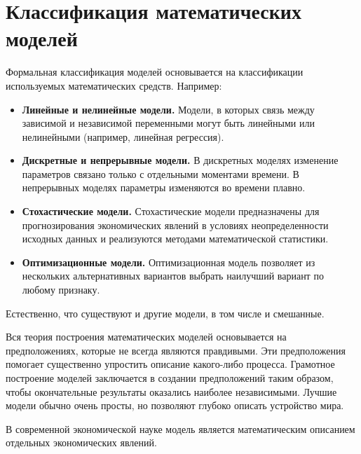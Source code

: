 \section{Классификация математических моделей}

Формальная классификация моделей основывается на классификации используемых математических средств.
Например:
\begin{itemize}
	\item \textbf{Линейные и нелинейные модели.}
	Модели, в которых связь между зависимой и независимой переменными могут быть линейными или нелинейными (например, линейная регрессия).
	\item \textbf{Дискретные и непрерывные модели.}
	В дискретных моделях изменение параметров связано только с отдельными моментами времени.
	В непрерывных моделях параметры изменяются во времени плавно.
	\item \textbf{Стохастические модели.}
	Стохастические модели предназначены для прогнозирования экономических явлений в условиях неопределенности исходных данных и реализуются методами математической статистики.
	\item \textbf{Оптимизационные модели.}
	Оптимизационная модель позволяет из нескольких альтернативных вариантов выбрать наилучший вариант по любому признаку.
\end{itemize}
Естественно, что существуют и другие модели, в том числе и смешанные.

Вся теория построения математических моделей основывается на предположениях, которые не всегда являются правдивыми.
Эти предположения помогает существенно упростить описание какого-либо процесса.
Грамотное построение моделей заключается в создании предположений таким образом, чтобы окончательные результаты оказались наиболее независимыми.
Лучшие модели обычно очень просты, но позволяют глубоко описать устройство мира.

В современной экономической науке модель является математическим описанием отдельных экономических явлений.
